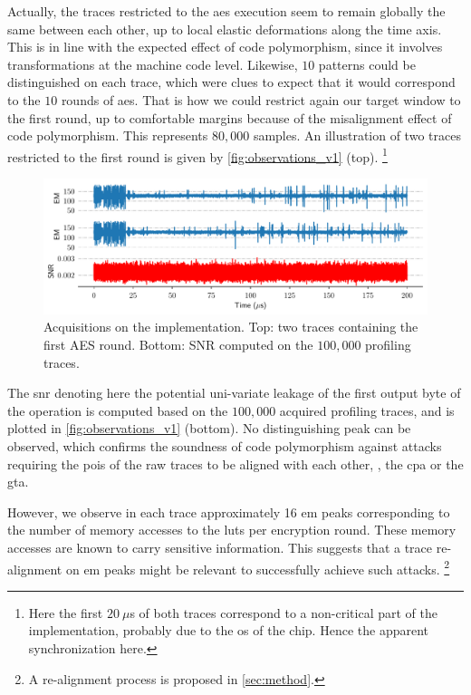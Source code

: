 Actually, the traces restricted to the \gls{aes} execution seem to remain globally the same between each other, up to local elastic deformations along the time axis.
This is in line with the expected effect of code polymorphism, since it involves transformations at the machine code level.
Likewise, \(10\) patterns could be distinguished on each trace, which were clues to expect that it would correspond to the \(10\) rounds of \gls{aes}. 
That is how we could restrict again our target window to the first round, up to comfortable margins because of the misalignment effect of code polymorphism.
This represents \(80,000\) samples.
An illustration of two traces restricted to the first round is given by \autoref{fig:observations_v1} (top).%
\footnote{Here the first \(20\ \mu\)s of both traces correspond to a non-critical part of the implementation, probably due to the \gls{os} of the chip.
Hence the apparent synchronization here.}

\begin{figure}[t]
	\centering
	\includegraphics[width=\textwidth]{CLAPS/v1/snr_raw}
	\caption{Acquisitions on the \mbedTLS{} implementation.
	Top: two traces containing the first AES round.
	Bottom: SNR computed on the \(100,000\) profiling traces.}
	\label{fig:observations_v1}
\end{figure}

The \gls{snr} denoting here the potential uni-variate leakage of the first output byte of the \sub{} operation is computed based on the \(100,000\) acquired profiling traces, and is plotted in \autoref{fig:observations_v1} (bottom).
No distinguishing peak can be observed, which confirms the soundness of code polymorphism against attacks requiring the \glspl{poi} of the raw traces to be aligned with each other, \eg{}, the \gls{cpa} or the \gls{gta}.

However, we observe in each trace approximately 16 \gls{em} peaks corresponding to the number of memory accesses to the \glspl{lut} per encryption round.
These memory accesses are known to carry sensitive information.
This suggests that a trace re-alignment on \gls{em} peaks might be relevant to successfully achieve such attacks.%
\footnote{
    A re-alignment process is proposed in \autoref{sec:method}.
}

